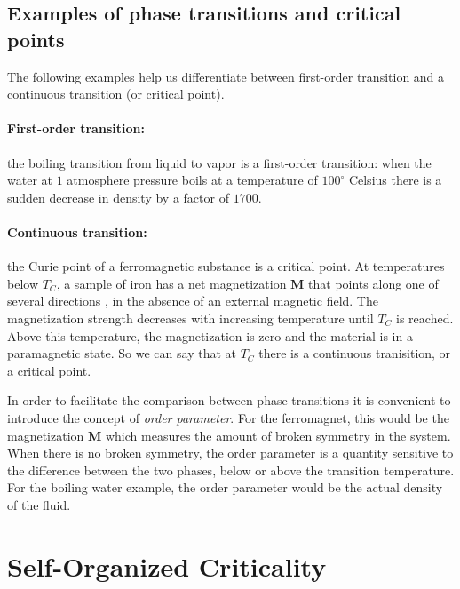 \subsection{Examples of phase transitions and critical points}
The following examples help us differentiate between first-order transition and a continuous transition (or critical point).\par
\paragraph{First-order transition:}
the boiling transition from liquid to vapor is a first-order transition: when the water at $1$ atmosphere pressure boils at a temperature of $100 ^{\circ}$ Celsius there is a sudden decrease in density by a factor of $1700$.

\paragraph{Continuous transition:}
the Curie point of a ferromagnetic substance is a critical point. At temperatures below $T_C$, a sample of iron has a net magnetization $\bm{M}$ that points along one of several directions , in the absence of an external magnetic field. The magnetization strength decreases with increasing temperature until $T_C$ is reached. Above this temperature, the magnetization is zero and the material is in a paramagnetic state. So we can say that at $T_C$ there is a continuous tranisition, or a critical point.

In order to facilitate the comparison between phase transitions it is convenient to introduce the concept of {\it order parameter}. For the ferromagnet, this would be the magnetization $\bm{M}$ which measures the amount of broken symmetry in the system. When there is no broken symmetry, the order parameter is a quantity sensitive to the difference between the two phases, below or above the transition temperature. For the boiling water example, the order parameter would be the actual density of the fluid.


\section{Self-Organized Criticality}

